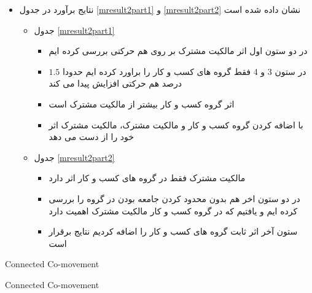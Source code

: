 \begin{itemize}
	\item 
	نتایج برآورد در جدول 
	\ref{mresult2part1}
	و
	\ref{mresult2part2}
	نشان داده شده است
	
	\begin{itemize}
		\item
		جدول
		\ref{mresult2part1}
		\begin{itemize}
			
			\item 
			در دو ستون اول  اثر مالکیت مشترک بر روی هم حرکتی بررسی کرده ایم
			\item 
			در ستون 3 و 4 فقط گروه های کسب و کار را براورد کرده ایم حدودا $1.5$ درصد هم حرکتی افزایش پیدا می کند
			\item 
			اثر گروه کسب و کار بیشتر از مالکیت مشترک است
			\item 
			با اضافه کردن گروه کسب و کار و مالکیت مشترک، مالکیت مشترک اثر خود را از دست می دهد
		\end{itemize}
		
		\item
		جدول
		\ref{mresult2part2}
		\begin{itemize}
			\item 
			مالکیت مشترک فقط در گروه های کسب و کار اثر دارد
			\item
			در دو ستون اخر هم بدون محدود کردن جامعه بودن در گروه را بررسی کرده ایم و یافتیم که در گروه کسب و کار مالکیت مشترک اهمیت دارد
			\item
			ستون آخر اثر ثابت گروه های کسب و کار را اضافه کردیم نتایج برقرار است
		\end{itemize}
		
	\end{itemize} 
\end{itemize}

{\begin{table}[p]
		\centering
		\caption{Connected Co-movement}
		\label{mresult2part1}
		\resizebox{1\textwidth}{!}{
			\begin{LTR}
				\lr{}
			\end{LTR}
		}
\end{table}}

{\begin{table}[p]
		\centering
		\caption{Connected Co-movement}
		\label{mresult2part2}
		\resizebox{1\textwidth}{!}{
			\begin{LTR}
				\lr{}
			\end{LTR}
		}
\end{table}}


